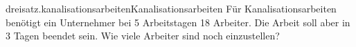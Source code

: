 \begin{exercise}{dreisatz.kanalisationsarbeiten}{Kanalisationsarbeiten}
  \ifproblem\problem
    Für Kanalisationsarbeiten benötigt ein Unternehmer bei 5 Arbeitstagen 18
    Arbeiter. Die Arbeit soll aber in 3 Tagen beendet sein. Wie viele Arbeiter
    sind noch einzustellen?
  \fi
\end{exercise}
